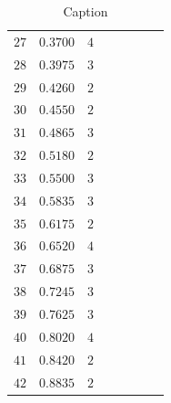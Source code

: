 \documentclass[12pt, a4paper]{article}
\begin{document}
\begin{table}[!htb]
{\begin{tabular}{|c|c|c|c|c|c|c|c|}
    \footnotesize $27 $& \footnotesize$0.3700$& $4$& &&&&\\
    \footnotesize $28 $& \footnotesize$0.3975$& $3$& &&&&\\
    \footnotesize $29 $& \footnotesize$0.4260$& $2$& &&&&\\
    \footnotesize $30 $& \footnotesize$0.4550$& $2$& &&&&\\ 
    \footnotesize $31 $& \footnotesize$0.4865$& $3$& &&&&\\
    \footnotesize $32 $& \footnotesize$0.5180$& $2$& &&&&\\
    \footnotesize $33 $& \footnotesize$0.5500$& $3$& &&&&\\
    \footnotesize $34 $& \footnotesize$0.5835$& $3$& &&&&\\
    \footnotesize $35 $& \footnotesize$0.6175$& $2$& &&&&\\
    \footnotesize $36 $& \footnotesize$0.6520$& $4$& &&&&\\
    \footnotesize $37 $& \footnotesize$0.6875$& $3$& &&&&\\
    \footnotesize $38 $& \footnotesize$0.7245$& $3$& &&&&\\
    \footnotesize $39 $& \footnotesize$0.7625$& $3$& &&&&\\
    \footnotesize $40 $& \footnotesize$0.8020$& $4$& &&&&\\
    \footnotesize $41 $&\footnotesize $0.8420$& $2$& &&&&\\
    \footnotesize $42$&\footnotesize $0.8835$ & $2$& &&&&\\
\hline
\end{tabular}}
  \caption{Caption}
  \label{Tabella Completa}
\end{table}
\end{document}
